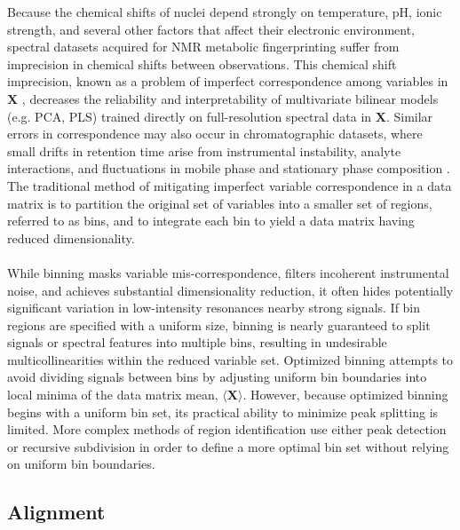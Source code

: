 \begin{doublespace}
Because the chemical shifts of \hnmr{} nuclei depend strongly on temperature,
pH, ionic strength, and several other factors that affect their electronic
environment, spectral datasets acquired for NMR metabolic fingerprinting
suffer from imprecision in \hnmr{} chemical shifts between observations.
This chemical shift imprecision, known as a problem of imperfect correspondence
among variables in $\mathbf{X}$ \cite{aberg:abc2009}, decreases the reliability
and interpretability of multivariate bilinear models (e.g. PCA, PLS) trained
directly on full-resolution spectral data in $\mathbf{X}$. Similar errors in
correspondence may also occur in chromatographic datasets, where small drifts
in retention time arise from instrumental instability, analyte interactions,
and fluctuations in mobile phase and stationary phase composition
\cite{nielsen:jchrom1998}. The traditional method of mitigating imperfect
variable correspondence in a data matrix is to partition the original set
of variables into a smaller set of regions, referred to as bins, and
to integrate each bin to yield a data matrix having reduced dimensionality.
\\\\
While binning masks variable mis-correspondence, filters incoherent
instrumental noise, and achieves substantial dimensionality reduction, it often
hides potentially significant variation in low-intensity resonances nearby
strong signals. If bin regions are specified with a uniform size, binning is
nearly guaranteed to split signals or spectral features into multiple bins,
resulting in undesirable multicollinearities within the reduced variable set.
Optimized binning \cite{sousa:cils2013} attempts to avoid dividing signals
between bins by adjusting uniform bin boundaries into local minima of the
data matrix mean, $\langle\mathbf{X}\rangle$. However, because optimized
binning begins with a uniform bin set, its practical ability to minimize peak
splitting is limited. More complex methods of region identification use either
peak detection \cite{davis:cils2007} or recursive subdivision
\cite{demeyer:anchem2008} in order to define a more optimal bin set without
relying on uniform bin boundaries.
\end{doublespace}

\subsection{Alignment}

